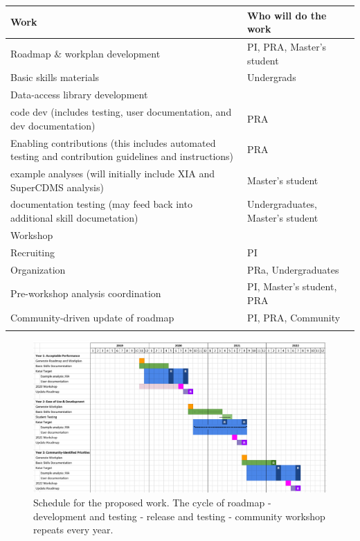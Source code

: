 \begin{tabularx}{\textwidth}{XX}
Work & Who will do the work \\
\toprule
Roadmap \& workplan development
& PI, PRA, Master's student\\

Basic skills materials 
& Undergrads\\

Data-access library development
& \\
\midrule
code dev (includes testing, user documentation, and dev documentation)
& PRA\\

Enabling contributions (this includes automated testing and contribution guidelines and instructions)
& PRA\\

example analyses (will initially include XIA and SuperCDMS analysis)
& Master's student\\

documentation testing (may feed back into additional skill documetation)
& Undergraduates, Master's student\\

Workshop
& \\
\midrule
Recruiting
& PI\\
Organization
& PRa, Undergraduates\\
Pre-workshop analysis coordination
& PI, Master's student, PRA\\

Community-driven update of roadmap
& PI, PRA, Community\\
\label{tab:WBS}
\end{tabularx}

\begin{figure}[htb]
    \begin{center}
      \includegraphics[width=\textwidth]{Figures/schedule1}
    \end{center}
    \caption{Schedule for the proposed work.  The cycle of roadmap - development and testing - release and testing - community workshop repeats every year. }
    \label{fig:ops-schedule}
\end{figure}